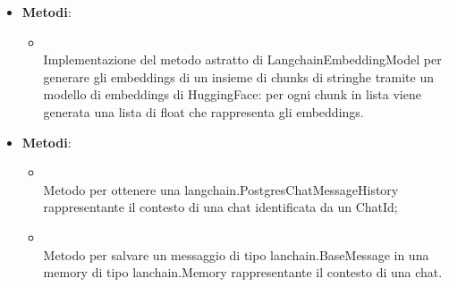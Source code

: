 \documentclass[10pt, a4paper]{article}
\begin{document}
\label{HuggingFaceEmbeddingModelDettaglio}
\begin{itemize}
    \item \textbf{Metodi}:
    \begin{itemize}
        \item {}\\
        Implementazione del metodo astratto di LangchainEmbeddingModel per generare gli embeddings di un insieme di chunks di stringhe tramite un modello di embeddings di HuggingFace: per ogni chunk in lista viene generata una lista di float che rappresenta gli embeddings.
    \end{itemize}
\end{itemize}

\label{ChatHistoryManagerDettaglio}
\begin{itemize}
    \item \textbf{Metodi}:
    \begin{itemize}
        \item {}\\
        Metodo per ottenere una langchain.PostgresChatMessageHistory rappresentante il contesto di una chat identificata da un ChatId;
        \item {}\\
        Metodo per salvare un messaggio di tipo lanchain.BaseMessage in una memory di tipo lanchain.Memory rappresentante il contesto di una chat. 
    \end{itemize}
\end{itemize}
\end{document}
